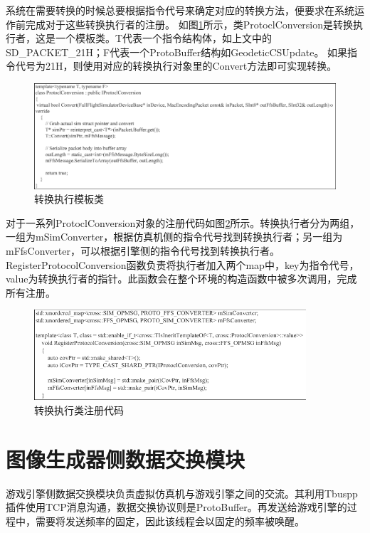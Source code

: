 \par
系统在需要转换的时候总要根据指令代号来确定对应的转换方法，便要求在系统运作前完成对于这些转换执行者的注册。
如图\ref{convtmp}所示，类ProtoclConversion是转换执行者，这是一个模板类。T代表一个指令结构体，如上文中的SD\_PACKET\_21H；F代表一个ProtoBuffer结构如GeodeticCSUpdate。
如果指令代号为21H，则使用对应的转换执行对象里的Convert方法即可实现转换。
\begin{figure}[h!]
    \begin{center}
        \includegraphics[width=\textwidth]{pictures/code13.pdf}
        \caption{转换执行模板类}
        \label{convtmp}
    \end{center}
\end{figure}
\par
对于一系列ProtoclConversion对象的注册代码如图\ref{regiconv}所示。转换执行者分为两组，一组为mSimConverter，根据仿真机侧的指令代号找到转换执行者；另一组为mFfsConverter，可以根据引擎侧的指令代号找到转换执行者。
RegisterProtocolConversion函数负责将执行者加入两个map中，key为指令代号，value为转换执行者的指针。此函数会在整个环境的构造函数中被多次调用，完成所有注册。
\begin{figure}[h!]
    \begin{center}
        \includegraphics[width=0.9\textwidth]{pictures/code14.pdf}
        \caption{转换执行类注册代码}
        \label{regiconv}
    \end{center}
\end{figure}
\section{图像生成器侧数据交换模块}
游戏引擎侧数据交换模块负责虚拟仿真机与游戏引擎之间的交流。其利用Tbuspp插件使用TCP消息沟通，数据交换协议则是ProtoBuffer。再发送给游戏引擎的过程中，需要将发送频率的固定，因此该线程会以固定的频率被唤醒。
